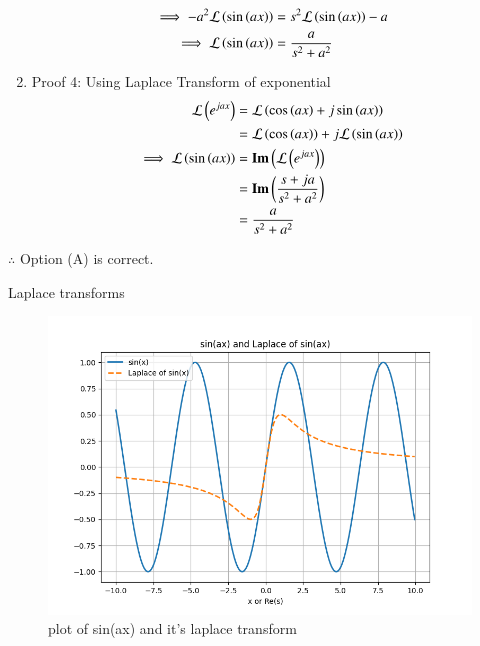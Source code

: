 \documentclass[journal,12pt,twocolumn]{IEEEtran}
\begin{document}
\begin{enumerate}
\begin{align}
       \implies -a^2\mathcal{L}\left(\sin\left(ax\right)\right) &= s^2\mathcal{L}\left(\sin\left(ax\right)\right) - a\\
       \implies \mathcal{L}\left(\sin\left(ax\right)\right) &= \frac{a}{s^2 + a^2}
    \end{align} 
\bigskip
    \item Proof 4: Using Laplace Transform of exponential\\
    \begin{align}
        \mathcal{L}\left(e^{jax}\right) &= \mathcal{L}\left(\cos\left(ax\right) + j\sin\left(ax\right)\right)\\
        &= \mathcal{L}\left(\cos\left(ax\right)\right) + j\mathcal{L}\left(\sin\left(ax\right)\right)\\
        \implies \mathcal{L}\left(\sin\left(ax\right)\right) &= \mathbf{Im}\left(\mathcal{L}\left(e^{jax}\right)\right)\\
        &= \mathbf{Im}\left(\frac{s + ja}{s^2 + a^2}\right)\\
        &= \frac{a}{s^2 + a^2}
    \end{align}
\end{enumerate}
\bigskip

$\therefore$ Option (A) is correct.

\begin{table}[ht]
     \begin{adjustbox}{width=\columnwidth}
       
    \end{adjustbox}
    \caption{Laplace transforms}
    \label{tab:tab1_2022_es_13_054}
\end{table}

\begin{figure}[ht]
    \centering
    \includegraphics[width=\columnwidth]{figs/Figure_1.png}
    \caption{plot of sin(ax) and it's laplace transform}
    \label{fig:fig1_2022_es_13_054}
\end{figure}
\end{document}
